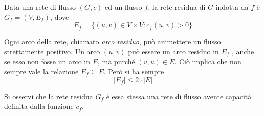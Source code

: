         Data una rete di flusso $(G, c)$ ed un flusso $f$, la rete residua di $G$ indotta da $f$ è $G_f = (V, E_f )$, dove
        \begin{equation}
            E_f = \{(u, v) \in V \times V : c_f(u, v) > 0\}
        \end{equation}
        
        Ogni arco della rete, chiamato \textit{arco residuo}, può ammettere un flusso strettamente positivo.
        Un arco $(u, v)$ può essere un arco residuo in $E_f$ , anche se esso non fosse un arco in $E$, ma purché $(v, u) \in E$. Ciò implica che non sempre vale la relazione $E_f \subseteq E$. Però si ha sempre
        \begin{equation}
            |E_f| \le 2 \cdot |E|
        \end{equation}
        
        Si osservi che la rete residua $G_f$ è essa stessa una rete di flusso avente capacità definita dalla funzione $c_f$.
    